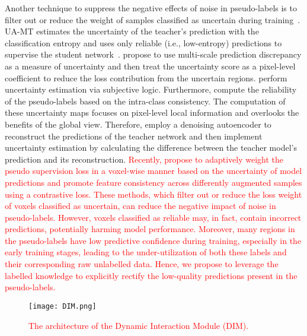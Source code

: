 Another technique to suppress the negative effects of noise in pseudo-labels is to filter out or reduce the weight of samples classified as uncertain during training~\citep{wang2021tripled,xia2020uncertainty}. UA-MT estimates the uncertainty of the teacher's prediction with the classification entropy and uses only reliable (i.e., low-entropy) predictions to supervise the student network~\citep{yu2019uncertainty}. \citet{luo2021efficient} propose to use multi-scale prediction discrepancy as a measure of uncertainty and then treat the uncertainty score as a pixel-level coefficient to reduce the loss contribution from the uncertain regions. \citet{luo2021semi} perform uncertainty estimation via subjective logic. Furthermore, \citet{su2024mutual} compute the reliability of the pseudo-labels based on the intra-class consistency. 
The computation of these uncertainty maps focuses on pixel-level local information and overlooks the benefits of the global view. Therefore, \citet{ADIGAV2024103011} employ a denoising autoencoder to reconstruct the predictions of the teacher network and then implement uncertainty estimation by calculating the difference between the teacher model's prediction and its reconstruction. \textcolor{red}{Recently, \citet{10273222} propose to adaptively weight the pseudo supervision loss in a voxel-wise manner based on the uncertainty of model predictions and promote feature consistency across differently augmented samples using a contrastive loss. These methods, which filter out or reduce the loss weight of voxels classified as uncertain, can reduce the negative impact of noise in pseudo-labels. However, voxels classified as reliable may, in fact, contain incorrect predictions, potentially harming model performance. Moreover, many regions in the pseudo-labels have low predictive confidence during training, especially in the early training stages, leading to the under-utilization of both these labels and their corresponding raw unlabelled data. Hence, we propose to leverage the labelled knowledge to explicitly rectify the low-quality predictions present in the pseudo-labels.}
\begin{figure}[!t]
\centering
\texttt{[image: DIM.png]}
\caption{\textcolor{red}{The architecture of the Dynamic Interaction Module (DIM).}}
\label{fig:dim}
\end{figure}
